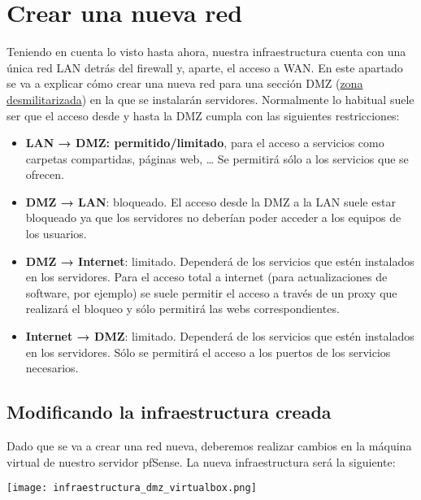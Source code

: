 \hypertarget{crear_una_nueva_red}{}
\chapter{Crear una nueva red}

Teniendo en cuenta lo visto hasta ahora, nuestra infraestructura cuenta con una única red LAN detrás del firewall y, aparte, el acceso a WAN. En este apartado se va a explicar cómo crear una nueva red para una sección DMZ (\href{https://es.wikipedia.org/wiki/Zona_desmilitarizada_(inform%C3%A1tica)}{zona desmilitarizada}) en la que se instalarán servidores.
Normalmente lo habitual suele ser que el acceso desde y hasta la DMZ cumpla con las siguientes restricciones:

\begin{itemize}
    \item \textbf{LAN → DMZ: permitido/limitado}, para el acceso a servicios como carpetas compartidas, páginas web, … Se permitirá sólo a los servicios que se ofrecen.
    \item  \textbf{DMZ → LAN}: bloqueado. El acceso desde la DMZ a la LAN suele estar bloqueado ya que los servidores no deberían poder acceder a los equipos de los usuarios.
    \item \textbf{DMZ → Internet}: limitado. Dependerá de los servicios que estén instalados en los servidores. Para el acceso total a internet (para actualizaciones de software, por ejemplo) se suele permitir el acceso a través de un proxy que realizará el bloqueo y sólo permitirá las webs correspondientes.
    \item \textbf{Internet → DMZ}: limitado. Dependerá de los servicios que estén instalados en los servidores. Sólo se permitirá el acceso a los puertos de los servicios necesarios.
\end{itemize}

\section{Modificando la infraestructura creada}

Dado que se va a crear una red nueva, deberemos realizar cambios en la máquina virtual de nuestro servidor pfSense. La nueva infraestructura será la siguiente:

\begin{center}
    \vspace{-20pt}
    \texttt{[image: infraestructura\_dmz\_virtualbox.png]}
    \vspace{-20pt}
\end{center}

